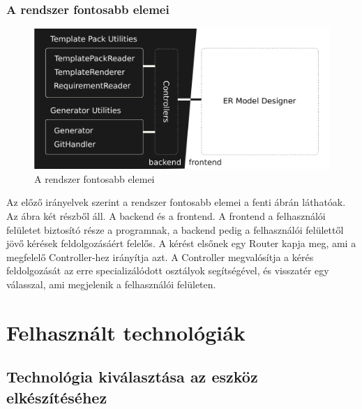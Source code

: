 \documentclass[a4paper,12pt,oneside]{report}
\begin{document}
\subsubsection{A rendszer fontosabb elemei}


\begin{justify}

	\begin{figure}[ht]
		\includegraphics[width=\textwidth]{contents/images/components.png}
		\caption{A rendszer fontosabb elemei}
		\label{fig:components}
	\end{figure}

	Az előző irányelvek szerint a rendszer fontosabb elemei a fenti ábrán láthatóak. Az ábra két részből áll. A backend és a frontend. A frontend a felhasználói felületet biztosító része a programnak, a backend pedig a felhasználói felülettől jövő kérések feldolgozásáért felelős. A kérést elsőnek egy Router kapja meg, ami a megfelelő Controller-hez irányítja azt. A Controller megvalósítja a kérés feldolgozását az erre specializálódott osztályok segítségével, és visszatér egy válasszal, ami megjelenik a felhasználói felületen. 


\end{justify}
\newpage
\section{Felhasznált technológiák}
\subsection{Technológia kiválasztása az eszköz elkészítéséhez}
\end{document}

